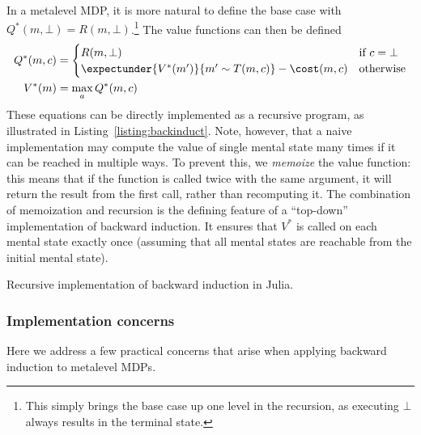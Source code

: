 In a metalevel MDP, it is more natural to define the base case with $Q^*(m, \bot) = R(m, \bot)$.\footnote{%
  This simply brings the base case up one level in the recursion, as executing $\bot$ always results in the terminal state.
} The value functions can then be defined
\begin{equation}\label{eq:value-recursive-meta}
\begin{aligned}
    Q^*(m, c) &= \begin{cases}
      R(m, \bot) &\text{if } c = \bot \\
      \expectunder{V^*(m')}{m' \sim T(m,c)} - \cost(m, c) &\text{otherwise}
    \end{cases} \\
    V^*(m) &= \max_a Q^*(m, c)
\end{aligned}
\end{equation}
These equations can be directly implemented as a recursive program, as illustrated in Listing~\ref{listing:backinduct}. Note, however, that a naive implementation may compute the value of single mental state many times if it can be reached in multiple ways. To prevent this, we \emph{memoize} the value function: this means that if the function is called twice with the same argument, it will return the result from the first call, rather than recomputing it. The combination of memoization and recursion is the defining feature of a ``top-down'' implementation of backward induction. It ensures that $V^*$ is called on each mental state exactly once (assuming that all mental states are reachable from the initial mental state).


\begin{listing}[tb!]
\caption{Recursive implementation of backward induction in Julia.}
\label{listing:backinduct}
\end{listing}

\subsubsection{Implementation concerns}

Here we address a few practical concerns that arise when applying backward induction to metalevel MDPs.

